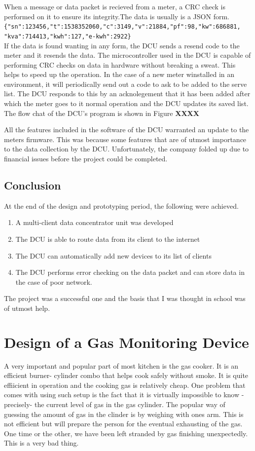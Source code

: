 When a message or data packet is recieved from a meter, a CRC check is performed on it to ensure its integrity.The data is usually is a JSON form.\\
 \verb|{"sn":123456,"t":1538352060,"c":3149,"v":21884,"pf":98,"kw":686881,|\\
 \verb|"kva":714413,"kwh":127,"e-kwh":2922}|\\
If the data is found wanting in any form, the DCU sends a resend code to the meter and it resends the data. The microcontroller used in the DCU is capable of performing CRC checks on data in hardware without breaking a sweat. This helps to speed up the operation. In the case of a new meter winstalled in an environment, it will periodically send out a code to ask to be added to the serve list. The DCU  responds to this by an acknolegement that it has been added after which the meter goes to it normal operation and the DCU updates its saved list. The flow chat of the DCU's program is shown in Figure \textbf{XXXX}

All the features included in the software of the DCU warranted an update to the meters firmware. This was because some features that are of utmost importance to the data collection by the DCU. Unfortunately, the company folded up due to financial issues before the project could be completed.

\subsection{Conclusion}
At the end of the design and prototyping period, the following were achieved.
\begin{enumerate}
\item A multi-client data concentrator unit was developed
\item The DCU is able to route data from its client to the internet
\item The DCU can automatically add new devices to its list of clients
\item The DCU performs error checking on the data packet and can store data in the case of poor network.
\end{enumerate}

The project was a successful one and the basis that I was thought in school was of utmost help.
 
\section{Design of a Gas Monitoring Device} 
A very important and popular part of most kitchen is the gas cooker. It is an efficient burner- cylinder combo that helps cook safely without smoke. It is quite effiicient in operation and the cooking gas is relatively cheap. One problem that comes with using such setup is the fact that it is virtually impossible to know -precisely- the current level of gas in the gas cylinder. The popular way of guessing the amount of gas in the clinder is by weighing with ones arm. This is not efficient but will prepare the person for the eventual exhausting of the gas. One time or the other, we have been left stranded by gas finishing unexpectedly. This is a very bad thing.

